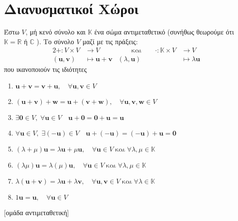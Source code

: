 


\let\vec\mathbf






\chapter{Διανυσματικοί Χώροι}


\begin{dfn}
\item {}
    Έστω $V$, μή κενό σύνολο και $\mathbb{K}$ ένα σώμα αντιμεταθετικό 
    (συνήθως θεωρούμε ότι $ \mathbb{K} = \mathbb{R} $ ή $\mathbb{C}$ ). 
    Το σύνολο $V$ μαζί με τις πράξεις:
    \begin{alignat*}{2}
        + \colon V \times V &\to V & \qquad \text{και} \qquad \cdot \colon \mathbb{K} 
        \times V &\to V \\ ( \vec{u}, \vec{v} ) &\mapsto \vec{u} + \vec{v} 
                 & ( \lambda, \vec{u} ) &\mapsto \lambda \vec{u} 
    \end{alignat*}
    \vspace{\baselineskip}
    που ικανοποιούν τις ιδιότητες 

    \begin{minipage}{0.5\textwidth}
        \begin{enumerate}
            \item $ \vec{u} + \vec{v} = \vec{v} + \vec{u}, \quad \forall \mathbf{u}, 
                \mathbf{v} \in V $ 
                \hfill{}
            \item $ ( \vec{u} + \vec{v} ) + \vec{w} = \vec{u} + ( \vec{v} + \vec{w}),
                \quad \forall \mathbf{u}, \mathbf{v}, \mathbf{w} \in V $ 
            \item $ \exists \vec{0} \in V, \; \forall \mathbf{u} \in V \quad 
                \vec{u} + \vec{0} = \vec{0} + \vec{u} = \vec{u} $ 
            \item $ \forall \mathbf{u} \in V, \; \exists (- \mathbf{u}) \in V \quad  
                \vec{u} + ( - \vec{u} ) = ( - \vec{u} ) + \vec{u} = \vec{0} $ 
                \hfill{}
            \item $ ( \lambda + \mu ) \vec{u} = \lambda \vec{u} + \mu \vec{u}, \quad 
                \forall \mathbf{u} \in V \; \text{και} \; \forall \lambda, \mu \in 
                \mathbb{K} $ 
            \item $ ( \lambda \mu ) \vec{u} = \lambda ( \mu) \vec{u}, \quad  
                \forall \mathbf{u} \in V \; \text{και} \; \forall \lambda, \mu \in 
                \mathbb{K} $ 
            \item $ \lambda ( \vec{u} + \vec{v} ) = \lambda \vec{u} + \lambda \vec{v}, 
                \quad \forall \mathbf{u}, \mathbf{v} \in V \; \text{και} \; \forall  
                \lambda \in \mathbb{K} $ 
            \item $ 1 \vec{u} = \vec{u}, \quad \forall \mathbf{u} \in V $ 
        \end{enumerate}
        [ομάδα αντιμεταθετική]
    \end{minipage}


\end{dfn}
